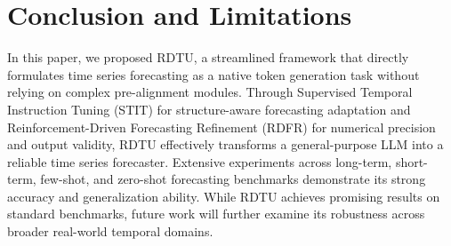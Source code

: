 \section{Conclusion and Limitations}

In this paper, we proposed RDTU, a streamlined framework that directly formulates time series forecasting as a native token generation task without relying on complex pre-alignment modules. Through Supervised Temporal Instruction Tuning (STIT) for structure-aware forecasting adaptation and Reinforcement-Driven Forecasting Refinement (RDFR) for numerical precision and output validity, RDTU effectively transforms a general-purpose LLM into a reliable time series forecaster. Extensive experiments across long-term, short-term, few-shot, and zero-shot forecasting benchmarks demonstrate its strong accuracy and generalization ability. While RDTU achieves promising results on standard benchmarks, future work will further examine its robustness across broader real-world temporal domains.
